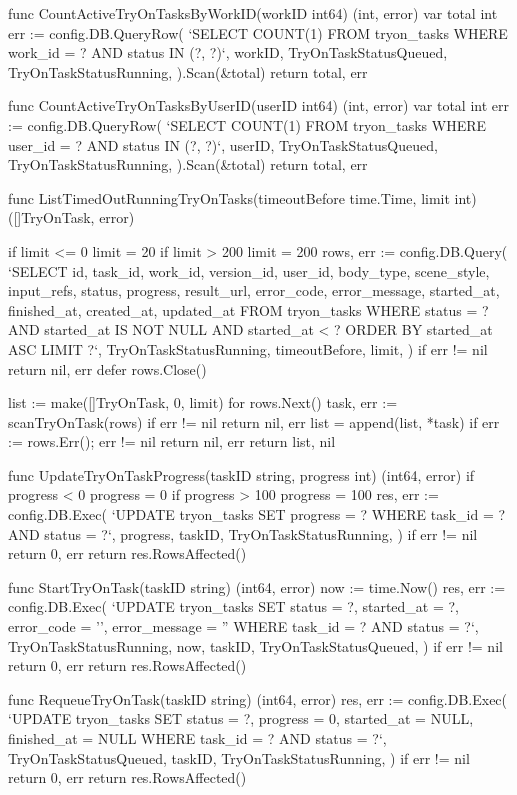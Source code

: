 \documentclass[twoside]{thesis-cls-Miya} %
\begin{document}
func CountActiveTryOnTasksByWorkID(workID int64) (int, error) {
	var total int
	err := config.DB.QueryRow(
		`SELECT COUNT(1)
		   FROM tryon_tasks
		  WHERE work_id = ? AND status IN (?, ?)`,
		workID, TryOnTaskStatusQueued, TryOnTaskStatusRunning,
	).Scan(&total)
	return total, err
}

func CountActiveTryOnTasksByUserID(userID int64) (int, error) {
	var total int
	err := config.DB.QueryRow(
		`SELECT COUNT(1)
		   FROM tryon_tasks
		  WHERE user_id = ? AND status IN (?, ?)`,
		userID, TryOnTaskStatusQueued, TryOnTaskStatusRunning,
	).Scan(&total)
	return total, err
}

func ListTimedOutRunningTryOnTasks(timeoutBefore time.Time, limit int) ([]TryOnTask, error) {
	if limit <= 0 {
		limit = 20
	}
	if limit > 200 {
		limit = 200
	}
	rows, err := config.DB.Query(
		`SELECT id, task_id, work_id, version_id, user_id, body_type, scene_style, input_refs, status, progress,
		        result_url, error_code, error_message, started_at, finished_at, created_at, updated_at
		   FROM tryon_tasks
		  WHERE status = ? AND started_at IS NOT NULL AND started_at < ?
		  ORDER BY started_at ASC
		  LIMIT ?`,
		TryOnTaskStatusRunning, timeoutBefore, limit,
	)
	if err != nil {
		return nil, err
	}
	defer rows.Close()

	list := make([]TryOnTask, 0, limit)
	for rows.Next() {
		task, err := scanTryOnTask(rows)
		if err != nil {
			return nil, err
		}
		list = append(list, *task)
	}
	if err := rows.Err(); err != nil {
		return nil, err
	}
	return list, nil
}

func UpdateTryOnTaskProgress(taskID string, progress int) (int64, error) {
	if progress < 0 {
		progress = 0
	}
	if progress > 100 {
		progress = 100
	}
	res, err := config.DB.Exec(
		`UPDATE tryon_tasks
		    SET progress = ?
		  WHERE task_id = ? AND status = ?`,
		progress, taskID, TryOnTaskStatusRunning,
	)
	if err != nil {
		return 0, err
	}
	return res.RowsAffected()
}

func StartTryOnTask(taskID string) (int64, error) {
	now := time.Now()
	res, err := config.DB.Exec(
		`UPDATE tryon_tasks
		    SET status = ?, started_at = ?, error_code = '', error_message = ''
		  WHERE task_id = ? AND status = ?`,
		TryOnTaskStatusRunning, now, taskID, TryOnTaskStatusQueued,
	)
	if err != nil {
		return 0, err
	}
	return res.RowsAffected()
}

func RequeueTryOnTask(taskID string) (int64, error) {
	res, err := config.DB.Exec(
		`UPDATE tryon_tasks
		    SET status = ?, progress = 0, started_at = NULL, finished_at = NULL
		  WHERE task_id = ? AND status = ?`,
		TryOnTaskStatusQueued, taskID, TryOnTaskStatusRunning,
	)
	if err != nil {
		return 0, err
	}
	return res.RowsAffected()
}
\end{document}
